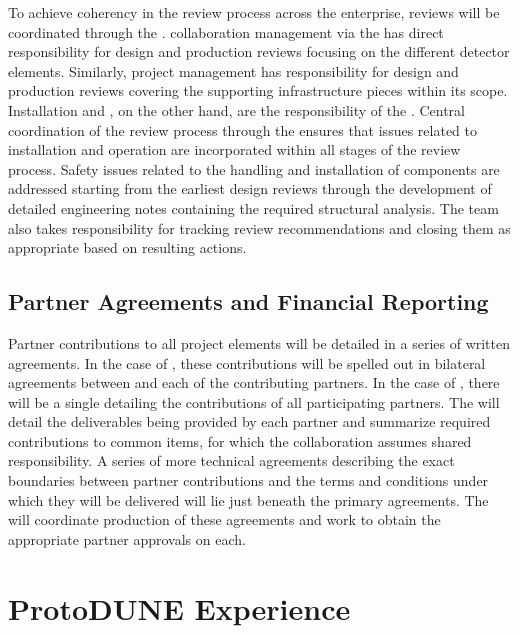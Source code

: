 To achieve coherency in the review process across the 
 enterprise, reviews will be coordinated 
through the .   collaboration 
management via the  has direct responsibility
for design and production reviews focusing on the different 
detector elements.  Similarly,   project 
management has responsibility for design and production 
reviews covering the supporting infrastructure pieces  
within its scope.  Installation and , on the 
other hand, are the responsibility of the . 
Central coordination of the review process through the
 ensures that issues related to installation 
and operation are incorporated within all stages of the 
review process.  Safety issues related to the handling 
and installation of components are addressed starting 
from the earliest design reviews through the development 
of detailed engineering notes containing the required
structural analysis.  The  team also takes 
responsibility for tracking review recommendations and 
closing them as appropriate based on resulting actions.

\subsection{Partner Agreements and Financial Reporting}
\label{sec:dune_agreements}

Partner contributions to all project elements will be detailed 
in a series of written agreements.  In the case of , 
these contributions will be spelled out in bilateral agreements 
between  and each of the contributing partners.  In 
the case of , there will be a single  
detailing the contributions of all participating partners.  The 
 will detail the deliverables being provided by each 
partner and summarize required contributions to common items, 
for which the collaboration assumes shared responsibility.  
A series of more technical agreements describing the exact 
boundaries between partner contributions and the terms and 
conditions under which they will be delivered will lie just 
beneath the primary agreements.  The  will coordinate 
production of these agreements and work to obtain the appropriate 
partner approvals on each.  

\section{ProtoDUNE Experience}
\label{sec:dune_protodune}

